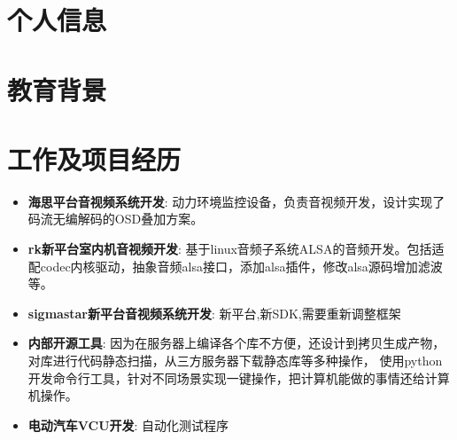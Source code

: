 \documentclass{resume}
\begin{document}


\section{个人信息}
 
\section{教育背景}

\section{工作及项目经历}

\begin{itemize}[parsep=0.2ex]
  \item \textbf{海思平台音视频系统开发}: \newline
    动力环境监控设备，负责音视频开发，设计实现了码流无编解码的OSD叠加方案。
  \item \textbf{rk新平台室内机音视频开发}: \newline
    基于linux音频子系统ALSA的音频开发。包括适配codec内核驱动，抽象音频alsa接口，添加alsa插件，修改alsa源码增加滤波等。
  \item \textbf{sigmastar新平台音视频系统开发}:\newline
    新平台,新SDK,需要重新调整框架
  \item \textbf{内部开源工具}:\newline
    因为在服务器上编译各个库不方便，还设计到拷贝生成产物，对库进行代码静态扫描，从三方服务器下载静态库等多种操作，
    使用python开发命令行工具，针对不同场景实现一键操作，把计算机能做的事情还给计算机操作。
\end{itemize}

\begin{itemize}[parsep=0.2ex]
  \item \textbf{电动汽车VCU开发}: 自动化测试程序
\end{itemize}
\end{document}
